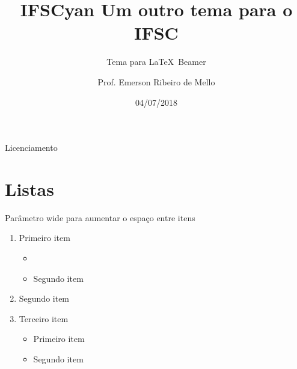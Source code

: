 \documentclass{beamer}
\title{IFSCyan Um outro tema para o IFSC}
\subtitle{Tema para \LaTeX~Beamer}
\author{Prof. Emerson Ribeiro de Mello}
\institute{%
\href{mello@ifsc.edu.br}{mello@ifsc.edu.br}%
}%
\date{04/07/2018}
\begin{document}
\begin{frame}[plain]
	\titlepage
\end{frame}




\begin{frame}{Licenciamento}
	\licenciamentoLivre
\end{frame}

\section{Listas}

\begin{frame}[wide]{Parâmetro wide para aumentar o espaço entre itens}
	\begin{enumerate}
		\item Primeiro item
		\begin{itemize}
			\item {}
			\item Segundo item
		\end{itemize}
		\item Segundo item
		\item Terceiro item 
		\begin{itemize}
			\item Primeiro item
			\item Segundo item
		\end{itemize}
	\end{enumerate}
\end{frame}
\end{document}

